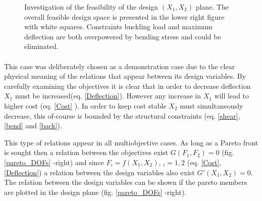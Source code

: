 \begin{figure}[h!]
\begin{minipage}[b]{0.5\linewidth}
\end{minipage}
\begin{minipage}[b]{0.5\linewidth}
 \centering
\end{minipage}

\caption{Investigation of the feasibility of the design $(X_1,X_2)$ plane. The overall feasible design space is presented in the lower right figure with white squares. Constraints buckling load and maximum deflection  are both overpowered by bending stress and could be eliminated.} 
\label{x1x2}
\end{figure}


\paragraph{}
This case was deliberately chosen as a demonstration case due to the clear physical meaning of the relations that appear between its design variables. By carefully examining the objectives it is clear that in order to decrease deflection $X_1$ must be increased(eq. \ref{Deflection}). However any increase in $X_1$ will lead to higher cost (eq. \ref{Cost} ). In order to keep cost stable $X_2$ must simultaneously decrease, this of-course is bounded by the structural constraints (eq. \ref{shear},\ref{bend} and \ref{back}). 
 
This type of relations appear in all multiobjective cases. As long as a Pareto front is sought then a relation between the objectives exist $G(F_1,F_2)=0$ (fig. \ref{pareto_DOFs} -right) and since $F_i=f(X_1,X_2)$, $_i=1,2$ (eq. \ref{Cost},\ref{Deflection}) a relation between the design variables also exist $G'(X_1,X_2)=0$. The relation between the design variables can be shown if the pareto members are plotted in the design plane (fig. \ref{pareto_DOFs} -right).

